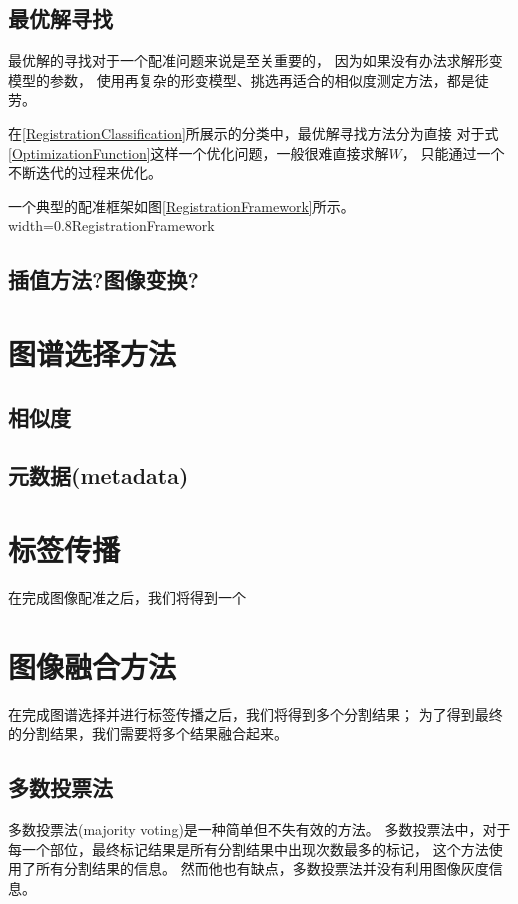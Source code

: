 \subsection{最优解寻找}\label{SectionOptimization}
最优解的寻找对于一个配准问题来说是至关重要的，
因为如果没有办法求解形变模型的参数，
使用再复杂的形变模型、挑选再适合的相似度测定方法，都是徒劳。

在\ref{RegistrationClassification}所展示的分类中，最优解寻找方法分为直接
对于式\ref{OptimizationFunction}这样一个优化问题，一般很难直接求解$W$，
只能通过一个不断迭代的过程来优化。

一个典型的配准框架如图\ref{RegistrationFramework}所示。
%
{width=0.8\textwidth}{RegistrationFramework}

\subsection{插值方法?图像变换?}\label{SectionModality}

\section{图谱选择方法}

\subsection{相似度}
\subsection{元数据(metadata)}

\section{标签传播}
在完成图像配准之后，我们将得到一个

\section{图像融合方法}
在完成图谱选择并进行标签传播之后，我们将得到多个分割结果；
为了得到最终的分割结果，我们需要将多个结果融合起来。

\subsection{多数投票法}
多数投票法(majority voting)是一种简单但不失有效的方法。
多数投票法中，对于每一个部位，最终标记结果是所有分割结果中出现次数最多的标记，
这个方法使用了所有分割结果的信息。
然而他也有缺点，多数投票法并没有利用图像灰度信息。

